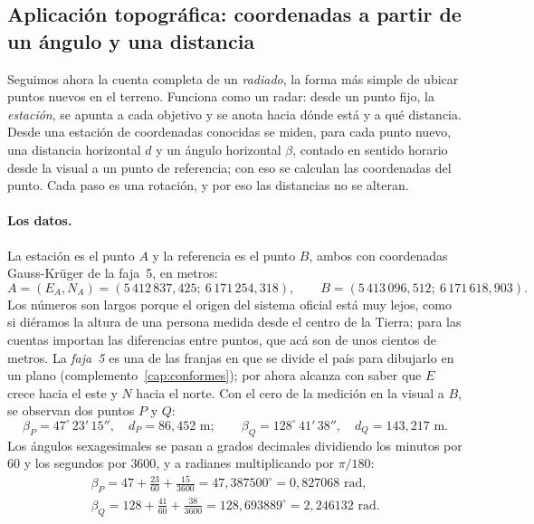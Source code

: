 \subsection{Aplicación topográfica: coordenadas a partir de un ángulo y una distancia}\label{sec:rotaciones-aplicacion}

Seguimos ahora la cuenta completa de un \emph{radiado}, la forma más simple de ubicar puntos
nuevos en el terreno. Funciona como un radar: desde un punto fijo, la \emph{estación}, se
apunta a cada objetivo y se anota hacia dónde está y a qué distancia. Desde una estación de coordenadas
conocidas se miden, para cada punto nuevo, una distancia horizontal \(d\) y un ángulo
horizontal \(\beta\), contado en sentido horario desde la visual a un punto de referencia; con
eso se calculan las coordenadas del punto. Cada paso es una rotación, y por eso las distancias
no se alteran.

\paragraph{Los datos.} La estación es el punto \(A\) y la referencia es el punto \(B\), ambos
con coordenadas Gauss-Krüger de la faja~5, en metros:
\[
A=(E_A,N_A)=(5\,412\,837{,}425;\ 6\,171\,254{,}318),\qquad
B=(5\,413\,096{,}512;\ 6\,171\,618{,}903).
\]
Los números son largos porque el origen del sistema oficial está muy lejos, como si diéramos
la altura de una persona medida desde el centro de la Tierra; para las cuentas importan las
diferencias entre puntos, que acá son de unos cientos de metros. La \emph{faja~5} es una de
las franjas en que se divide el país para dibujarlo en un plano (complemento~\ref{cap:conformes});
por ahora alcanza con saber que \(E\) crece hacia el este y \(N\) hacia el norte. Con el cero
de la medición en la visual a \(B\), se observan dos puntos \(P\) y \(Q\):
\[
\beta_P=47^\circ\,23'\,15'',\quad d_P=86{,}452\text{ m};\qquad
\beta_Q=128^\circ\,41'\,38'',\quad d_Q=143{,}217\text{ m}.
\]
Los ángulos sexagesimales se pasan a grados decimales dividiendo los minutos por \(60\) y los
segundos por \(3600\), y a radianes multiplicando por \(\pi/180\):
\[
\begin{gathered}
\beta_P=47+\tfrac{23}{60}+\tfrac{15}{3600}=47{,}387500^\circ=0{,}827068\text{ rad},\\
\beta_Q=128+\tfrac{41}{60}+\tfrac{38}{3600}=128{,}693889^\circ=2{,}246132\text{ rad}.
\end{gathered}
\]

